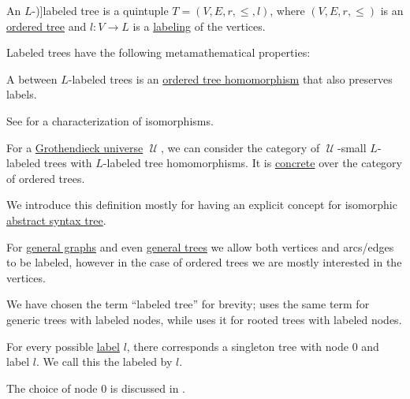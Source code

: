 \begin{definition}\label{def:labeled_tree}\mimprovised
  An \( L \)-\term[en=labeled tree (\cite[exer. 11.1.38]{Rosen2019DiscreteMathematics})]{labeled tree} is a quintuple \( T = (V, E, r, \leq, l) \), where \( (V, E, r, \leq) \) is an \hyperref[def:ordered_tree]{ordered tree} and \( l: V \to L \) is a \hyperref[def:labeled_set]{labeling} of the vertices.

  Labeled trees have the following metamathematical properties:
  \begin{thmenum}
     A  between \( L \)-labeled trees is an \hyperref[def:ordered_tree/homomorphism]{ordered tree homomorphism} that also preserves labels.

    See  for a characterization of isomorphisms.

     For a \hyperref[def:grothendieck_universe]{Grothendieck universe} \( \mscrU \), we can consider the category of \( \mscrU \)-small \( L \)-labeled trees with \( L \)-labeled tree homomorphisms. It is \hyperref[def:concrete_category]{concrete} over the category of ordered trees.
  \end{thmenum}
\end{definition}
\begin{comments}
  \item We introduce this definition mostly for having an explicit concept for isomorphic \hyperref[con:abstract_syntax_tree]{abstract syntax tree}.

  \item For \hyperref[rem:arbitrary_kind_graph]{general graphs} and even \hyperref[def:tree]{general trees} we allow both vertices and arcs/edges to be labeled, however in the case of ordered trees we are mostly interested in the vertices.

  We have chosen the term \enquote{labeled tree} for brevity;  uses the same term for generic trees with labeled nodes, while  uses it for rooted trees with labeled nodes.
\end{comments}

\begin{definition}\label{def:canonical_singleton_tree}\mimprovised
  For every possible \hyperref[def:labeled_set]{label} \( l \), there corresponds a singleton tree with node \( 0 \) and label \( l \). We call this the  labeled by \( l \).

  The choice of node \( 0 \) is discussed in .
\end{definition}

